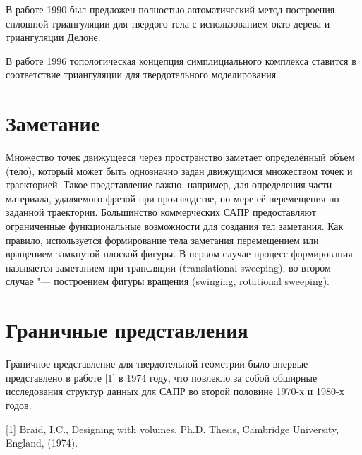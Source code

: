 В работе \cite{A combined octree/Delaunay method for fully automatic 3-d mesh generation} 1990 был предложен полностью автоматический метод построения сплошной триангуляции для твердого тела с использованием окто-дерева и триангуляции Делоне.

В работе \cite{Modeling with Simplicial Complexes} 1996 топологическая концепция симплициального комплекса ставится в соответствие триангуляции для твердотельного моделирования. 

\section{Заметание} \label{sect_sweeping}

Множество точек движущееся через пространство заметает определённый объем (тело), который может быть однозначно задан движущимся множеством точек и траекторией. Такое представление важно, например, для определения части материала, удаляемого фрезой при производстве, по мере её перемещения по заданной траектории. Большинство коммерческих САПР предоставляют ограниченные функциональные возможности для создания тел заметания. Как правило, используется формирование тела заметания перемещением или вращением замкнутой плоской фигуры. В первом случае процесс формирования называется заметанием при трансляции (translational sweeping), во втором случае "--- построением фигуры вращения (swinging, rotational sweeping).

\section{Граничные представления} \label{sect_boundary_rep}

Граничное представление для твердотельной геометрии было впервые представлено в работе [1] в 1974 году, что повлекло за собой обширные исследования структур данных для САПР во второй половине 1970-х и 1980-х годов.

[1] Braid, I.C., Designing with volumes, Ph.D. Thesis, Cambridge University, England, (1974).

